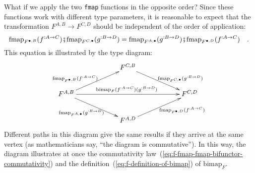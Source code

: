 What if we apply the two \lstinline!fmap! functions in the opposite
order? Since these functions work with different type parameters,
it is reasonable to expect that the transformation $F^{A,B}\rightarrow F^{C,D}$
should be independent of the order of application:
\begin{equation}
\text{fmap}_{F^{\bullet,B}}(f^{:A\rightarrow C})\bef\text{fmap}_{F^{C,\bullet}}(g^{:B\rightarrow D})=\text{fmap}_{F^{A,\bullet}}(g^{:B\rightarrow D})\bef\text{fmap}_{F^{\bullet,D}}(f^{:A\rightarrow C})\quad.\label{eq:f-fmap-fmap-bifunctor-commutativity}
\end{equation}
This equation is illustrated by the type diagram:
\[
\xymatrix{\xyScaleY{2.0pc}\xyScaleX{5.0pc} & F^{C,B}\ar[rd]\sp(0.6){\ ~~\text{fmap}_{F^{C,\bullet}}(g^{:B\rightarrow D})}\\
F^{A,B}\ar[ru]\sp(0.4){\text{fmap}_{F^{\bullet,B}}(f^{:A\rightarrow C})~~~}\ar[rd]\sb(0.5){\text{fmap}_{F^{A,\bullet}}(g^{:B\rightarrow D})~~\ }\ar[rr]\sp(0.5){\text{bimap}_{F}(f^{:A\rightarrow C})(g^{:B\rightarrow D})\ } &  & F^{C,D}\\
 & F^{A,D}\ar[ru]\sb(0.6){~~~~\text{fmap}_{F^{\bullet,D}}(f^{:A\rightarrow C})}
}
\]
Different paths in this diagram give the same results if they arrive
at the same vertex (as mathematicians say, \textsf{``}the diagram is commutative\textsf{''}).
In this way, the diagram illustrates at once the commutativity law~(\ref{eq:f-fmap-fmap-bifunctor-commutativity})
and the definition~(\ref{eq:f-definition-of-bimap}) of $\text{bimap}_{F}$.

